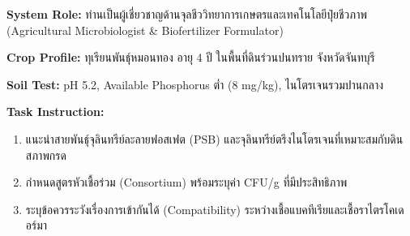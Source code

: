\begin{promptbox}
\textbf{System Role:} ท่านเป็นผู้เชี่ยวชาญด้านจุลชีววิทยาการเกษตรและเทคโนโลยีปุ๋ยชีวภาพ (Agricultural Microbiologist \& Biofertilizer Formulator)

\textbf{Crop Profile:} ทุเรียนพันธุ์หมอนทอง อายุ 4 ปี ในพื้นที่ดินร่วนปนทราย จังหวัดจันทบุรี

\textbf{Soil Test:} pH 5.2, Available Phosphorus ต่ำ (8 mg/kg), ไนโตรเจนรวมปานกลาง

\textbf{Task Instruction:}
\begin{enumerate}
    \item แนะนำสายพันธุ์จุลินทรีย์ละลายฟอสเฟต (PSB) และจุลินทรีย์ตรึงไนโตรเจนที่เหมาะสมกับดินสภาพกรด
    \item กำหนดสูตรหัวเชื้อร่วม (Consortium) พร้อมระบุค่า CFU/g ที่มีประสิทธิภาพ
    \item ระบุข้อควรระวังเรื่องการเข้ากันได้ (Compatibility) ระหว่างเชื้อแบคทีเรียและเชื้อราไตรโคเดอร์มา
\end{enumerate}
\end{promptbox}
